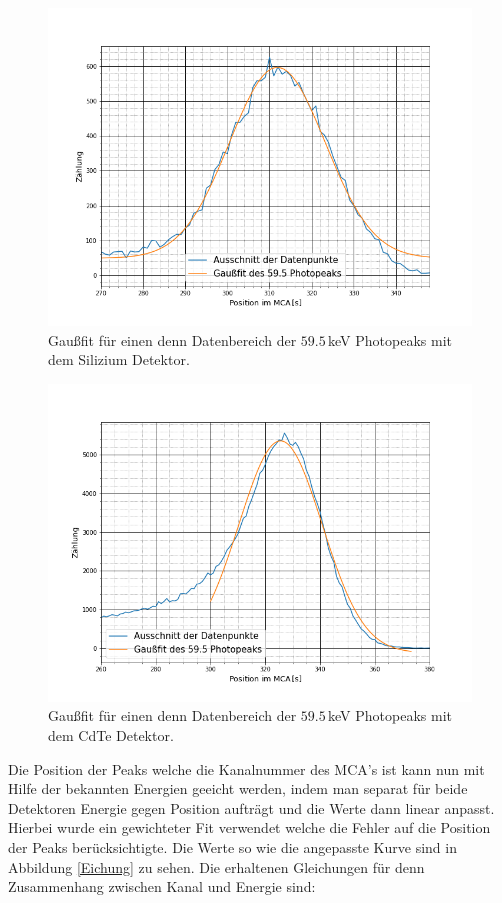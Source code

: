 \begin{figure}[ht]
	\includegraphics[scale=0.5]{Bild/AS.png}
	\centering
	\caption[V3 $59.5$\,keV Peaks mit Silizium Detektor]{Gaußfit für einen denn Datenbereich der $59.5$\,keV Photopeaks mit dem Silizium Detektor.}
	\label{AmS}
\end{figure}
\begin{figure}[ht]
	\includegraphics[scale=0.5]{Bild/AC.png}
	\centering
	\caption[V3 $59.5$\,keV Peaks mit CdTe Detektor]{Gaußfit für einen denn Datenbereich der $59.5$\,keV Photopeaks mit dem CdTe Detektor.}
	\label{AmC}
\end{figure}
\FloatBarrier
Die Position der Peaks welche die Kanalnummer des MCA's ist kann nun mit Hilfe der bekannten Energien geeicht werden, indem man separat für beide Detektoren Energie gegen Position aufträgt und die Werte dann linear anpasst. Hierbei wurde ein gewichteter Fit verwendet welche die Fehler auf die Position der Peaks berücksichtigte. Die Werte so wie die angepasste Kurve sind in Abbildung \ref{Eichung} zu sehen. Die erhaltenen Gleichungen für denn Zusammenhang zwischen Kanal und Energie sind:\par

